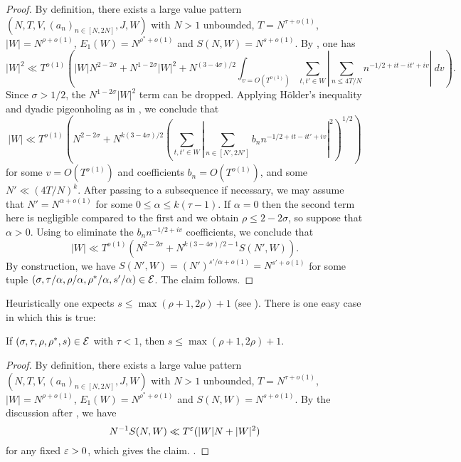 \begin{proof} By definition, there exists a large value pattern $(N,T,V,(a_n)_{n \in [N,2N]},J,W)$ with $N>1$ unbounded, $T = N^{\tau+o(1)}$, $|W| = N^{\rho+o(1)}$, $E_1(W) = N^{\rho^*+o(1)}$ and $S(N,W) = N^{s+o(1)}$.  By \cite[(11.58)]{ivic}, one has
$$ |W|^2 \ll T^{o(1)} \left( |W| N^{2-2\sigma} + N^{1-2\sigma} |W|^2 + N^{(3-4\sigma)/2} \int_{v = O(T^{o(1)})} \sum_{t,t' \in W} \left|\sum_{n \leq 4T/N} n^{-1/2+it-it'+iv}\right|\ dv \right).$$
Since $\sigma>1/2$, the $N^{1-2\sigma} |W|^2$ term can be dropped.  Applying H\"older's inequality and dyadic pigeonholing as in \cite[(11.59)]{ivic}, we conclude that
$$ |W| \ll T^{o(1)} \left(N^{2-2\sigma} + N^{k(3-4\sigma)/2}  \left(\sum_{t,t' \in W} \left|\sum_{n \in [N',2N']} b_n n^{-1/2+it-it'+iv}\right|^2\right)^{1/2}\right)$$
for some $v = O(T^{o(1)})$ and coefficients $b_n = O(T^{o(1)})$, and some $N' \ll (4T/N)^k$.  After passing to a subsequence if necessary, we may assume that $N' = N^{\alpha+o(1)}$ for some $0 \leq \alpha \leq k(\tau-1)$.  If $\alpha=0$ then the second term here is negligible compared to the first and we obtain $\rho \leq 2-2\sigma$, so suppose that $\alpha > 0$.  Using \cite[Lemma 11.1]{ivic} to eliminate the $b_n n^{-1/2+iv}$ coefficients, we conclude that
$$ |W| \ll T^{o(1)} (N^{2-2\sigma} + N^{k(3-4\sigma)/2-1} S(N', W)).$$
By construction, we have $S(N',W) = (N')^{s'/\alpha+o(1)} = N^{s'+o(1)}$ for some tuple $(\sigma, \tau/\alpha, \rho/\alpha, \rho^*/\alpha, s'/\alpha) \in \mathcal{E}$.  The claim follows.
\end{proof}

Heuristically one expects $s \leq \max( \rho+1, 2\rho)+1$ (see \cite[(11.63)]{ivic}).  There is one easy case in which this is true:

\begin{lemma}\label{easy-double-zeta-bound}  If $(\sigma,\tau,\rho,\rho^*,s) \in \mathcal{E}$ with $\tau < 1$, then $s \leq \max(\rho+1, 2\rho)+1$.
\end{lemma}

\literature
{}

\begin{proof} By definition, there exists a large value pattern $(N,T,V,(a_n)_{n \in [N,2N]},J,W)$ with $N>1$ unbounded, $T = N^{\tau+o(1)}$, $|W| = N^{\rho+o(1)}$, $E_1(W) = N^{\rho^*+o(1)}$ and $S(N,W) = N^{s+o(1)}$.  By the discussion after \cite[(11.63)]{ivic}, we have
    $$ N^{-1} S(N,W) \ll T^\varepsilon ( |W| N + |W|^2 )$$
for any fixed $\varepsilon>0$, which gives the claim.    .
\end{proof}


